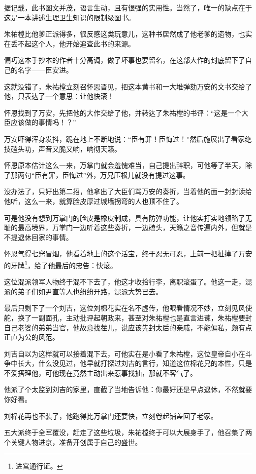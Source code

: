 \begin{multicols}{\theparacolNo}
据记载，此书图文并茂，语言生动，且有很强的实用性。当然了，唯一的缺点在于这是一本讲述生理卫生知识的限制级图书。

朱祐樘比他爹正派得多，很反感这类玩意儿，这种书居然成了他老爹的遗物，也实在丢不起这个人，他开始追查此书的来源。

偏巧这本手抄本的作者十分高调，做了坏事也要留名，在这部大作的封底留下了自己的名字——臣安进。

这就没错了，朱祐樘立刻召怀恩晋见，把这本黄书和一大堆弹劾万安的文书交给了他，只表达了一个意思：让他快滚！

怀恩找到了万安，先把他的大作交给了他，并转达了朱祐樘的书评：“这是一个大臣应该做的事情吗！？”

万安吓得浑身发抖，跪在地上不断地说：“臣有罪！臣悔过！”然后施展出了看家绝技磕头功，声音又脆又响，响彻天籁。

怀恩原本估计这么一来，万掌门就会羞愧难当，自己提出辞职，可他等了半天，除了那两句“臣有罪，臣悔过”外，万兄压根儿就没有提过这事。

没办法了，只好出第二招，他拿出了大臣们骂万安的奏折，当着他的面一封封读给他听，这么一来，就算脸皮厚过城墙拐弯的人也顶不住了。

可是他没有想到万掌门的脸皮是橡皮制成，具有防弹功能，让他实打实地领略了无耻的最高境界，万掌门一边听着这些奏折，一边磕头，天籁之音传遍内外，但就是不提退休回家的事情。

怀恩气得七窍冒烟，他看着地上的这个活宝，终于忍无可忍，上前一把扯掉了万安的牙牌\footnote{进宫通行证。}，给了他最后的忠告：快滚。

这位混派领军人物终于混不下去了，他这才收拾行李，离职滚蛋了。他这一走，混派的弟子们如尹直等人也纷纷开路，混派大势已去。

最后只剩下了一个刘吉，这位刘棉花实在名不虚传，他眼看情况不妙，立刻见风使舵，换了一副面孔，主动批评起朝政来，甚至对朱祐樘也是直言进谏，朱祐樘要封自己老婆的弟弟当官，他故意找茬儿，说应该先封太后的亲戚，不能偏私，颇有点正直为公的风范。

刘吉自以为这样就可以接着混下去，可他实在是小看了朱祐樘，这位皇帝自小在斗争中长大，什么没见过，他早就打探过刘吉的言行，知道这位棉花兄的本性，只是不爱搭理他，可他现在竟然主动出来惹事找抽，那就不客气了。

他派了个太监到刘吉的家里，直截了当地告诉他：你最好还是早点退休，不然就要你好看。

刘棉花再也不装了，他跑得比万掌门还要快，立刻卷起铺盖回了老家。

五大派终于全军覆没，赶走了这些垃圾，朱祐樘终于可以大展身手了，他召集了两个关键人物进京，准备开创属于自己的盛世。


\end{multicols}
